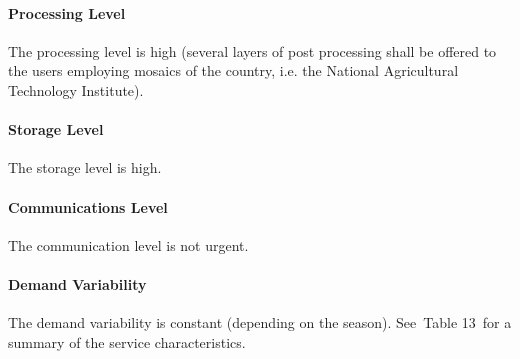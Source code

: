 \documentclass[a4paper]{article}
\begin{document}
\paragraph[Processing Level]{ Processing Level}
{
The processing level is high (several layers of post processing shall be
offered to the users employing mosaics of the country, i.e. the
National Agricultural Technology Institute).}

\paragraph[Storage Level]{ Storage Level}
{
The storage level is high.\ }

\paragraph[Communications Level]{ Communications
Level}
{
The communication level is not urgent.}

\paragraph[Demand Variability]{ Demand
Variability}
\foreignlanguage{english}{The demand variability is constant (depending
on the season). See\ }Table 13\foreignlanguage{english}{\ for a summary
of the service characteristics.}


\bigskip


\bigskip

\end{document}
